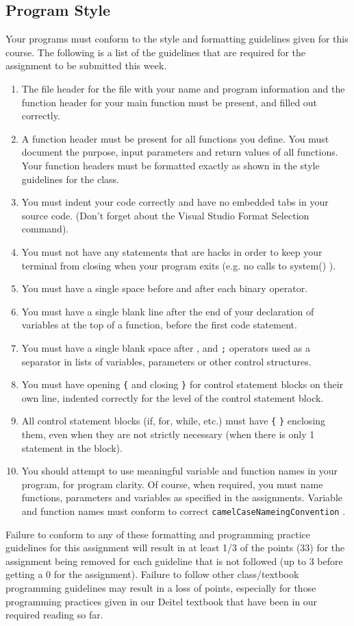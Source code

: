\documentclass[11pt]{article}
\begin{document}
\subsection*{Program Style}
\label{sec-5-2}

Your programs must conform to the style and formatting guidelines
given for this course.  The following is a list of the guidelines that
are required for the assignment to be submitted this week.

\begin{enumerate}
\item The file header for the file with your name and program information
and the function header for your main function must be present, and
filled out correctly.
\item A function header must be present for all functions you define.
You must document the purpose, input parameters and return values
of all functions.  Your function headers must be formatted exactly
as shown in the style guidelines for the class.
\item You must indent your code correctly and have no embedded tabs in
your source code. (Don't forget about the Visual Studio Format
Selection command).
\item You must not have any statements that are hacks in order to keep
your terminal from closing when your program exits (e.g. no calls
to system() ).
\item You must have a single space before and after each binary operator.
\item You must have a single blank line after the end of your declaration
of variables at the top of a function, before the first code
statement.
\item You must have a single blank space after , and \verb~;~ operators used as a
separator in lists of variables, parameters or other control
structures.
\item You must have opening \verb~{~ and closing \verb~}~ for control statement blocks
on their own line, indented correctly for the level of the control
statement block.
\item All control statement blocks (if, for, while, etc.) must have \verb~{~
\verb~}~ enclosing them, even when they are not strictly necessary
(when there is only 1 statement in the block).
\item You should attempt to use meaningful variable and function names in
your program, for program clarity.  Of course, when required, you
must name functions, parameters and variables as specified in the
assignments.  Variable and function names must conform to correct
\verb~camelCaseNameingConvention~ .
\end{enumerate}

Failure to conform to any of these formatting and programming practice
guidelines for this assignment will result in at least 1/3 of the
points (33) for the assignment being removed for each guideline that
is not followed (up to 3 before getting a 0 for the
assignment). Failure to follow other class/textbook programming
guidelines may result in a loss of points, especially for those
programming practices given in our Deitel textbook that have been in
our required reading so far.
\end{document}
